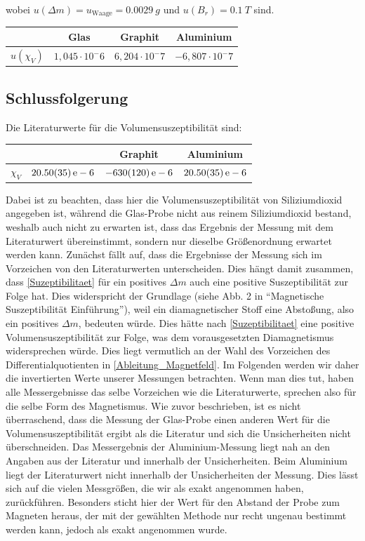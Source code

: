 \documentclass[
	a4paper,
	12pt,
	pagesize,
	ngerman
]{scrartcl}
\begin{document}
	wobei $u(\Delta m) = u_\text{Waage} = \SI{0,0029}{g}$ und $u(B_r) = \SI{0.1}{T}$ sind.

	\begin{tabular}{ r | c | c | c}
		& Glas & Graphit & Aluminium \\ \hline
		$u(\chi_V) $ &$1,045 \cdot 10^-6$&$6,204 \cdot 10^-7$&$-6,807 \cdot 10^-7$\\ \hline
	\end{tabular} \newline
	
	\subsection{Schlussfolgerung}
	Die Literaturwerte für die Volumensuszeptibilität sind: \newline
	\begin{tabular}{ r | c | c | c}
		& \ce{SiO2} & Graphit & Aluminium \\ \hline
		$\chi_V $ &$\SI{20,50 \pm 0,35}{e-6}$ &$\SI{-630 \pm 120}{e-6}$ &$\SI{20,50 \pm 0,35}{e-6}$\\ \hline
	\end{tabular} \newline
	Dabei ist zu beachten, dass hier die Volumensuszeptibilität von Siliziumdioxid angegeben ist, während die Glas-Probe nicht aus reinem Siliziumdioxid bestand, weshalb auch nicht zu erwarten ist, dass das Ergebnis der Messung mit dem Literaturwert übereinstimmt, sondern nur dieselbe Größenordnung erwartet werden kann. \newline
	Zunächst fällt auf, dass die Ergebnisse der Messung sich im Vorzeichen von den Literaturwerten unterscheiden. Dies hängt damit zusammen, dass \cref{Suzeptibilitaet} für ein positives $\Delta m$ auch eine positive Suszeptibilität zur Folge hat. Dies widerspricht der Grundlage (siehe Abb. 2 in \enquote{Magnetische Suszeptibilität Einführung}), weil ein diamagnetischer Stoff eine Abstoßung, also ein positives $\Delta m$, bedeuten würde. Dies hätte nach \cref{Suzeptibilitaet} eine positive Volumensuszeptibilität zur Folge, was dem vorausgesetzten Diamagnetismus widersprechen würde. Dies liegt vermutlich an der Wahl des Vorzeichen des Differentialquotienten in \cref{Ableitung_Magnetfeld}. Im Folgenden werden wir daher die invertierten Werte unserer Messungen betrachten. Wenn man dies tut, haben alle Messergebnisse das selbe Vorzeichen wie die Literaturwerte, sprechen also für die selbe Form des Magnetismus.\newline
	Wie zuvor beschrieben, ist es nicht überraschend, dass die Messung der Glas-Probe einen anderen Wert für die Volumensuszeptibilität ergibt als die Literatur und sich die Unsicherheiten nicht überschneiden. Das Messergebnis der Aluminium-Messung liegt nah an den Angaben aus der Literatur und innerhalb der Unsicherheiten. Beim Aluminium liegt der Literaturwert nicht innerhalb der Unsicherheiten der Messung. Dies lässt sich auf die vielen Messgrößen, die wir als exakt angenommen haben, zurückführen. Besonders sticht hier der Wert für den Abstand der Probe zum Magneten heraus, der mit der gewählten Methode nur recht ungenau bestimmt werden kann, jedoch als exakt angenommen wurde. \newline
\end{document}

